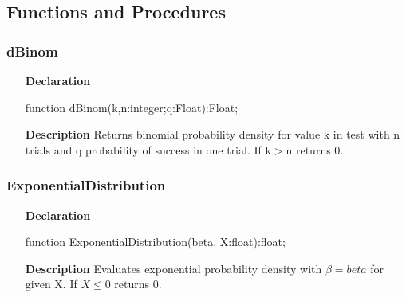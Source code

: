 \documentclass[12pt,a4paper,oneside]{report}
\newcommand{\declarationitem}[1]{\textbf{#1}}
\newcommand{\descriptiontitle}[1]{\textbf{#1}}
\begin{document}
\subsection{Functions and Procedures}
\subsubsection{dBinom}
\label{udistribs-dBinom}
\begin{itemize}\item[\declarationitem{Declaration}\hfill]
	\begin{flushleft}
		\begin{ttfamily}
			function dBinom(k,n:integer;q:Float):Float;\end{ttfamily}
		
	\end{flushleft}
	
	\par
	\item[\descriptiontitle{Description}]
	Returns binomial probability density for value k in test with n trials and q probability of success in one trial. If k{$>$}n returns 0.
	
\end{itemize}
\subsubsection{ExponentialDistribution}
\label{udistribs-ExponentialDistribution}
\begin{itemize}\item[\declarationitem{Declaration}\hfill]
	\begin{flushleft}
		\begin{ttfamily}
			function ExponentialDistribution(beta, X:float):float;\end{ttfamily}
		
	\end{flushleft}
	\item[\descriptiontitle{Description}]
	Evaluates exponential probability density with $\beta=beta$ for given X. If {$X\le 0$} returns 0.
	
\end{itemize}
\end{document}
